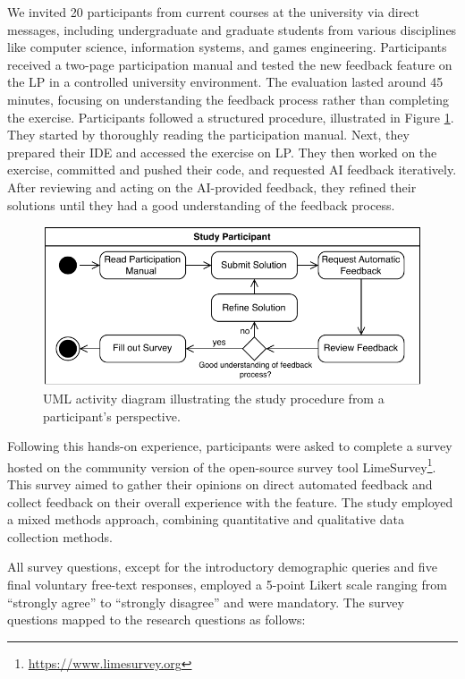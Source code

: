 \documentclass[sigconf,screen,review,anonymous]{acmart}
\begin{document}
We invited 20 participants from current courses at the university via direct messages, including undergraduate and graduate students from various disciplines like computer science, information systems, and games engineering. 
Participants received a two-page participation manual and tested the new feedback feature on the LP in a controlled university environment. 
The evaluation lasted around 45 minutes, focusing on understanding the feedback process rather than completing the exercise.
Participants followed a structured procedure, illustrated in Figure \ref{fig:Study-Design}.
They started by thoroughly reading the participation manual.
Next, they prepared their IDE and accessed the exercise on LP.
They then worked on the exercise, committed and pushed their code, and requested AI feedback iteratively.
After reviewing and acting on the AI-provided feedback, they refined their solutions until they had a good understanding of the feedback process.

\begin{figure}[htbp]
  \centering
  \includegraphics[width=\linewidth]{figures/Study-Design.pdf}
  \caption{UML activity diagram illustrating the study procedure from a participant's perspective.}
  \label{fig:Study-Design}
  \vspace{-4mm}
\end{figure}

Following this hands-on experience, participants were asked to complete a survey hosted on the community version of the open-source survey tool LimeSurvey\footnote{\url{https://www.limesurvey.org}}.
This survey aimed to gather their opinions on direct automated feedback and collect feedback on their overall experience with the feature.
The study employed a mixed methods approach, combining quantitative and qualitative data collection methods.

All survey questions, except for the introductory demographic queries and five final voluntary free-text responses, employed a 5-point Likert scale \cite{allen:2007:LikertScalesData} ranging from ``strongly agree'' to ``strongly disagree'' and were mandatory. 
The survey questions mapped to the research questions as follows:
\end{document}
